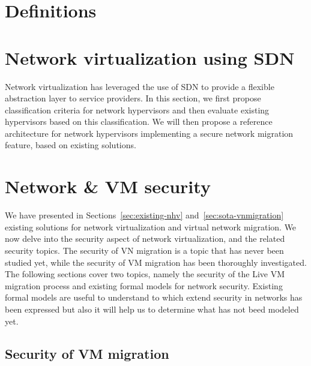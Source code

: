 \documentclass[a4paper, 11pt]{report}
\theoremstyle{definition}
\begin{document}
\section{Definitions}
\label{sec:basic_def}


\section{Network virtualization using SDN}

Network virtualization has leveraged the use of SDN to provide a flexible abstraction layer to service providers. In this section, we first propose classification criteria for network hypervisors and then evaluate existing hypervisors based on this classification. We will then propose a reference architecture for network hypervisors implementing a secure network migration feature, based on existing solutions.















\section{Network \& VM security}

We have presented in Sections~\ref{sec:existing-nhv} and~\ref{sec:sota-vnmigration} existing solutions for network virtualization and virtual network migration. We now delve into the security aspect of network virtualization, and the related security topics. The security of VN migration is a topic that has never been  studied yet, while the security of VM migration has been thoroughly investigated. The following sections cover two topics, namely the security of the Live VM migration process and existing formal models for network security.
Existing formal models are useful to understand to which extend security in networks has been expressed but also it will help us to determine what has not beed modeled yet.

\subsection{Security of VM migration}
\end{document}
